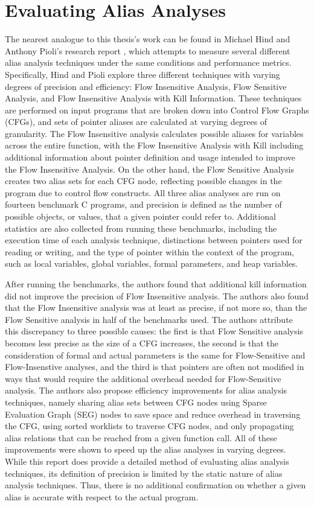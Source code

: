 \section{Evaluating Alias Analyses}
The nearest analogue to this thesis's work can be found in Michael Hind and Anthony Pioli's research report \cite{Hind_old}, which attempts to measure several different alias analysis techniques under the same conditions and performance metrics. Specifically, Hind and Pioli explore three different techniques with varying degrees of precision and efficiency: Flow Insensitive Analysis, Flow Sensitive Analysis, and Flow Insensitive Analysis with Kill Information. These techniques are performed on input programs that are broken down into Control Flow Graphs (CFGs), and sets of pointer aliases are calculated at varying degrees of granularity. The Flow Insensitive analysis calculates possible aliases for variables across the entire function, with the Flow Insensitive Analysis with Kill including additional information about pointer definition and usage intended to improve the Flow Insensitive Analysis. On the other hand, the Flow Sensitive Analysis creates two alias sets for each CFG node, reflecting possible changes in the program due to control flow constructs. All three alias analyses are run on fourteen benchmark C programs, and precision is defined as the number of possible objects, or values, that a given pointer could refer to. Additional statistics are also collected from running these benchmarks, including the execution time of each analysis technique, distinctions between pointers used for reading or writing, and the type of pointer within the context of the program, such as local variables, global variables, formal parameters, and heap variables.

After running the benchmarks, the authors found that additional kill information did not improve the precision of Flow Insensitive analysis. The authors also found that the Flow Insensitive analysis was at least as precise, if not more so, than the Flow Sensitive analysis in half of the benchmarks used. The authors attribute this discrepancy to three possible causes: the first is that Flow Sensitive analysis becomes less precise as the size of a CFG increases, the second is that the consideration of formal and actual parameters is the same for Flow-Sensitive and Flow-Insenstive analyses, and the third is that pointers are often not modified in ways that would require the additional overhead needed for Flow-Sensitive analysis. The authors also propose efficiency improvements for alias analysis techniques, namely sharing alias sets between CFG nodes using Sparse Evaluation Graph (SEG) nodes to save space and reduce overhead in traversing the CFG, using sorted worklists to traverse CFG nodes, and only propagating alias relations that can be reached from a given function call. All of these improvements were shown to speed up the alias analyses in varying degrees. While this report does provide a detailed method of evaluating alias analysis techniques, its definition of precision is limited by the static nature of alias analysis techniques. Thus, there is no additional confirmation on whether a given alias is accurate with respect to the actual program.

